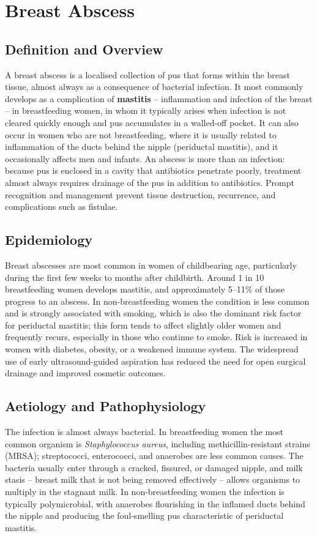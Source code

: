 \chapter{Breast Abscess}

\section*{Definition and Overview}
A breast abscess is a localised collection of pus that forms within the breast tissue, almost always as a consequence of bacterial infection. It most commonly develops as a complication of \textbf{mastitis} -- inflammation and infection of the breast -- in breastfeeding women, in whom it typically arises when infection is not cleared quickly enough and pus accumulates in a walled-off pocket. It can also occur in women who are not breastfeeding, where it is usually related to inflammation of the ducts behind the nipple (periductal mastitis), and it occasionally affects men and infants. An abscess is more than an infection: because pus is enclosed in a cavity that antibiotics penetrate poorly, treatment almost always requires drainage of the pus in addition to antibiotics. Prompt recognition and management prevent tissue destruction, recurrence, and complications such as fistulae.

\section*{Epidemiology}
Breast abscesses are most common in women of childbearing age, particularly during the first few weeks to months after childbirth. Around 1 in 10 breastfeeding women develops mastitis, and approximately 5--11\% of those progress to an abscess. In non-breastfeeding women the condition is less common and is strongly associated with smoking, which is also the dominant risk factor for periductal mastitis; this form tends to affect slightly older women and frequently recurs, especially in those who continue to smoke. Risk is increased in women with diabetes, obesity, or a weakened immune system. The widespread use of early ultrasound-guided aspiration has reduced the need for open surgical drainage and improved cosmetic outcomes.

\section*{Aetiology and Pathophysiology}
The infection is almost always bacterial. In breastfeeding women the most common organism is \textit{Staphylococcus aureus}, including methicillin-resistant strains (MRSA); streptococci, enterococci, and anaerobes are less common causes. The bacteria usually enter through a cracked, fissured, or damaged nipple, and milk stasis -- breast milk that is not being removed effectively -- allows organisms to multiply in the stagnant milk. In non-breastfeeding women the infection is typically polymicrobial, with anaerobes flourishing in the inflamed ducts behind the nipple and producing the foul-smelling pus characteristic of periductal mastitis.

